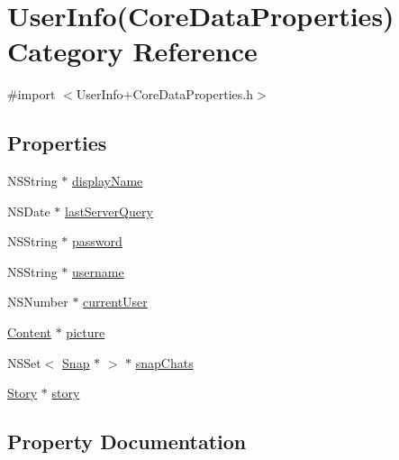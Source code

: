 \hypertarget{category_user_info_07_core_data_properties_08}{}\section{User\+Info(Core\+Data\+Properties) Category Reference}
\label{category_user_info_07_core_data_properties_08}


{\ttfamily \#import $<$User\+Info+\+Core\+Data\+Properties.\+h$>$}

\subsection*{Properties}
\begin{DoxyCompactItemize}
\item 
N\+S\+String $\ast$ \hyperlink{category_user_info_07_core_data_properties_08_ae3f7388231cb3ebbeb37678e809b39c8}{display\+Name}
\item 
N\+S\+Date $\ast$ \hyperlink{category_user_info_07_core_data_properties_08_aab2017ab16d2bef45391eaeec44b71d0}{last\+Server\+Query}
\item 
N\+S\+String $\ast$ \hyperlink{category_user_info_07_core_data_properties_08_a128961270ae5c23c5acbc461bb502083}{password}
\item 
N\+S\+String $\ast$ \hyperlink{category_user_info_07_core_data_properties_08_a678541351323dc073a5696e15f0b3f3c}{username}
\item 
N\+S\+Number $\ast$ \hyperlink{category_user_info_07_core_data_properties_08_a725f8b96488308d73380d050eed90b95}{current\+User}
\item 
\hyperlink{interface_content}{Content} $\ast$ \hyperlink{category_user_info_07_core_data_properties_08_abb220fe03fd04d798d5fff55a174a89c}{picture}
\item 
N\+S\+Set$<$ \hyperlink{interface_snap}{Snap} $\ast$ $>$ $\ast$ \hyperlink{category_user_info_07_core_data_properties_08_afdfa30db3ce1f305298e33e693e626e8}{snap\+Chats}
\item 
\hyperlink{interface_story}{Story} $\ast$ \hyperlink{category_user_info_07_core_data_properties_08_afeb3aca2ca38cb9b64ca84ee98e90260}{story}
\end{DoxyCompactItemize}


\subsection{Property Documentation}
\hypertarget{category_user_info_07_core_data_properties_08_a725f8b96488308d73380d050eed90b95}{}\label{category_user_info_07_core_data_properties_08_a725f8b96488308d73380d050eed90b95} 
